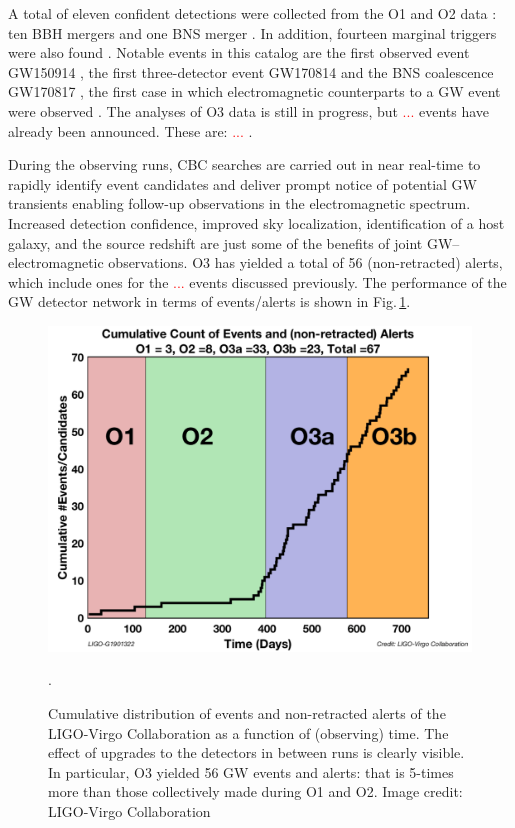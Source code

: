 \documentclass[binding=0.6cm, LaM]{sapthesis}
\newcommand{\fpg}[1]{\textcolor{red}{#1} }
\begin{document}
	A total of eleven confident detections were collected from the O1 and O2 data \cite{13}: 
	ten BBH mergers \cite{14, 52, 58-60} and one BNS merger \cite{61}.  In addition, fourteen marginal triggers were also found \cite{13}.
	Notable events in this catalog are the first observed event GW150914 \cite{52},
	the first three-detector event GW170814 \cite{60} and the BNS
	coalescence GW170817 \cite{61}, the first case in which electromagnetic counterparts to a GW event 
	were observed \cite{15}.
        The analyses of O3 data is still in progress, but \fpg{...} events have already been announced.  These are: \fpg{...}.

	During the observing runs, CBC searches are carried out in near real-time 
	to rapidly identify event candidates and deliver prompt notice of potential GW transients 
	enabling follow-up observations in the electromagnetic spectrum. 
	Increased detection confidence, improved sky localization, identification of a host galaxy, 
	and the source redshift are just some of the benefits of joint GW–electromagnetic observations.  O3 has yielded a total of 56 (non-retracted) alerts, which include ones for the \fpg{...} events discussed previously.  The performance of the GW detector network in terms of events/alerts is shown in Fig.\,\ref{fig:o3detection}. 

        \begin{figure}[!t]
          \label{o3detection}
          \includegraphics[scale=0.22]{o3detection}
          \centering
          \caption{Cumulative distribution of events and non-retracted alerts of the LIGO-Virgo Collaboration as a function of (observing) time.  The effect of upgrades to the detectors in between runs is clearly visible.  In particular, O3 yielded 56 GW events and alerts: that is 5-times more than those collectively made during O1 and O2. Image credit: LIGO-Virgo Collaboration}. 
          \label{fig:o3detection}
        \end{figure}
\end{document}
